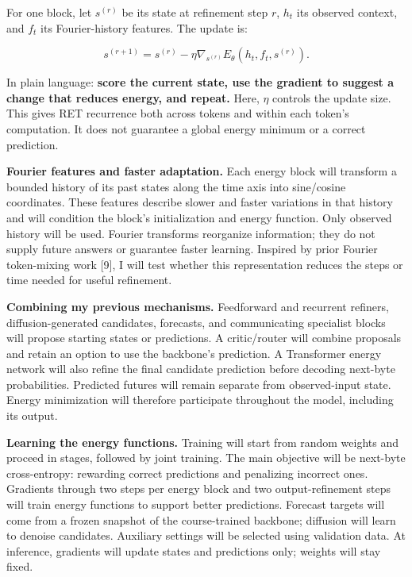 \documentclass[11pt,letterpaper]{article}
\begin{document}
For one block, let \(s^{(r)}\) be its state at refinement step \(r\), \(h_t\) its observed context, and \(f_t\) its Fourier-history features. The update is:

\[
s^{(r+1)}=s^{(r)}-\eta\nabla_{s^{(r)}}E_\theta(h_t,f_t,s^{(r)}).
\]

In plain language: \textbf{score the current state, use the gradient to suggest a change that reduces energy, and repeat.} Here, \(\eta\) controls the update size. This gives RET recurrence both across tokens and within each token's computation. It does not guarantee a global energy minimum or a correct prediction.

\textbf{Fourier features and faster adaptation.} Each energy block will transform a bounded history of its past states along the time axis into sine/cosine coordinates. These features describe slower and faster variations in that history and will condition the block's initialization and energy function. Only observed history will be used. Fourier transforms reorganize information; they do not supply future answers or guarantee faster learning. Inspired by prior Fourier token-mixing work [9], I will test whether this representation reduces the steps or time needed for useful refinement.

\textbf{Combining my previous mechanisms.} Feedforward and recurrent refiners, diffusion-generated candidates, forecasts, and communicating specialist blocks will propose starting states or predictions. A critic/router will combine proposals and retain an option to use the backbone's prediction. A Transformer energy network will also refine the final candidate prediction before decoding next-byte probabilities. Predicted futures will remain separate from observed-input state. Energy minimization will therefore participate throughout the model, including its output.

\textbf{Learning the energy functions.} Training will start from random weights and proceed in stages, followed by joint training. The main objective will be next-byte cross-entropy: rewarding correct predictions and penalizing incorrect ones. Gradients through two steps per energy block and two output-refinement steps will train energy functions to support better predictions. Forecast targets will come from a frozen snapshot of the course-trained backbone; diffusion will learn to denoise candidates. Auxiliary settings will be selected using validation data. At inference, gradients will update states and predictions only; weights will stay fixed.
\end{document}
